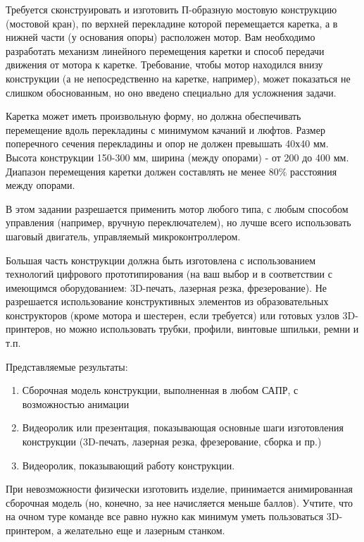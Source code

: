 

Требуется сконструировать и изготовить П-образную мостовую конструкцию (мостовой кран), 
по верхней перекладине которой перемещается каретка, а в нижней части (у основания опоры) 
расположен мотор. Вам необходимо разработать механизм линейного перемещения каретки и способ 
передачи движения от мотора к каретке. Требование, чтобы мотор находился внизу конструкции 
(а не непосредственно на каретке, например), может показаться не слишком обоснованным, 
но оно введено специально для усложнения задачи.

Каретка может иметь произвольную форму, но должна обеспечивать перемещение вдоль 
перекладины с минимумом качаний и люфтов. Размер поперечного сечения перекладины и 
опор не должен превышать 40х40 мм. Высота конструкции 150-300 мм, ширина (между опорами) - 
от 200 до 400 мм. Диапазон перемещения каретки должен составлять не менее $80\%$ расстояния между опорами.

В этом задании разрешается применить мотор любого типа, с любым способом управления 
(например, вручную переключателем), но лучше всего использовать шаговый двигатель, управляемый 
микроконтроллером.

Большая часть конструкции должна быть изготовлена с 
использованием технологий цифрового прототипирования (на ваш выбор и в соответствии 
с имеющимся оборудованием: 3D-печать, лазерная резка, фрезерование). Не разрешается использование 
конструктивных элементов из образовательных конструкторов (кроме мотора и шестерен, если требуется) или готовых узлов 3D-принтеров, но можно использовать трубки, профили, винтовые шпильки, ремни и т.п.  

Представляемые результаты:

\begin{enumerate}
    \item Сборочная модель конструкции, выполненная в любом САПР, с возможностью анимации
    \item Видеоролик или презентация, показывающая основные шаги изготовления конструкции (3D-печать, лазерная резка, фрезерование, сборка и пр.)
    \item Видеоролик, показывающий работу конструкции.
\end{enumerate}

При невозможности физически изготовить изделие, принимается анимированная сборочная модель 
(но, конечно, за нее начисляется меньше баллов). Учтите, что на очном туре команде все равно 
нужно как минимум уметь пользоваться 3D-принтером, а желательно еще и лазерным станком.